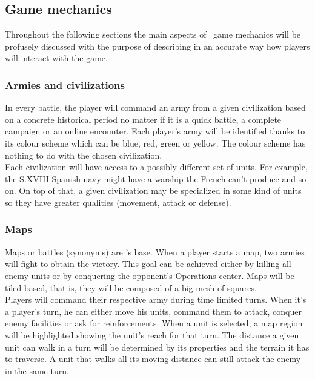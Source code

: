 
\subsection{Game mechanics}

Throughout the following sections the main aspects of \game\ game mechanics will be
profusely discussed with the purpose of describing in an accurate way how
players will interact with the game.\\

\subsubsection{Armies and civilizations}

In every battle, the player will command an army from a given civilization based
on a concrete historical period no matter if it is a quick battle, a complete
campaign or an online encounter. Each player's army will be identified thanks
to its colour scheme which can be blue, red, green or yellow. The colour scheme
has nothing to do with the chosen civilization.\\

Each civilization will have access to a possibly different set of units. For
example, the S.XVIII Spanish navy might have a warship the French can't produce
and so on. On top of that, a given civilization may be specialized in some
kind of units so they have greater qualities (movement, attack or defense).\\

\subsubsection{Maps}


Maps or battles (synonyms) are \game's base. When a player starts a map, two
armies will fight to obtain the victory. This goal can be achieved either by
killing all enemy units or by conquering the opponent's Operations center. Maps
will be tiled based, that is, they will be composed of a big mesh of squares.\\
 

Players will command their respective army during time limited turns. When it's
a player's turn, he can either move his units, command them to attack, conquer
enemy facilities or ask for reinforcements. When a unit is selected, a map
region will be highlighted showing the unit's reach for that turn. The distance
a given unit can walk in a turn will be determined by its properties and the
terrain it has to traverse. A unit that walks all its moving distance can still
attack the enemy in the same turn.\\

